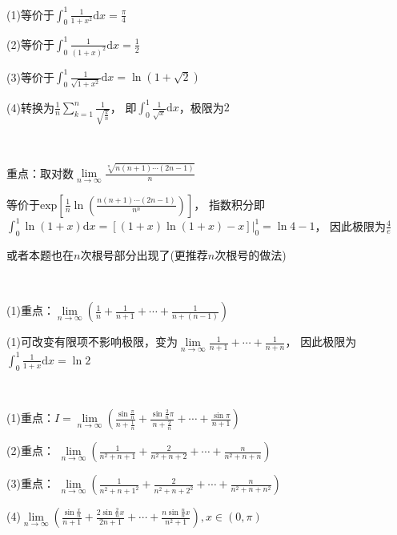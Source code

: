 \begin{solution}
  (1)等价于$\int_0^1 \frac{1}{1 + x^2}\mathrm{d} x = \frac{\pi}{4}$

  (2)等价于$\int_0^1 \frac{1}{(1 + x)^2}\mathrm{d} x = \frac{1}{2}$

  (3)等价于$\int_0^1 \frac{1}{\sqrt{1 + x^2}}\mathrm{d} x = \ln(1 + \sqrt{2})$
  
  (4)转换为$\frac{1}{n}\sum\limits_{k = 1}^n \frac{1}{\sqrt{\frac{k}{n}}}$，
  即$\int_0^1 \frac{1}{\sqrt{x}}\mathrm{d} x$，极限为$2$
\end{solution}

~

\begin{exercise}[对数+积分]
  重点：取对数$\lim \limits _{n \rightarrow \infty} \frac{\sqrt[n]{n(n+1)\cdots(2n-1)}}{n}$
\end{exercise}

\begin{solution}
  等价于$\text{exp} \left[ \frac{1}{n} \ln \left( \frac{n(n+1)\cdots(2n-1)}{n^n} \right) \right]$，
  指数积分即$\int_0^1 \ln(1+x)\mathrm{d} x = \left[ (1+x)\ln(1+x) - x \right] \bigg|_0^1 = \ln 4 - 1$，
  因此极限为$\frac{4}{e}$

  或者本题也在$n$次根号部分出现了(更推荐$n$次根号的做法)
\end{solution}

~

\begin{exercise}[改变有限项]
  (1)重点：$\lim \limits _{n \rightarrow \infty} \left( \frac{1}{n} + \frac{1}{n+1} + \cdots + \frac{1}{n+ (n-1)} \right)$
\end{exercise}

\begin{solution}
  (1)可改变有限项不影响极限，变为$\lim \limits _{n \rightarrow \infty} \frac{1}{n+1} + \cdots + \frac{1}{n+n}$，
  因此极限为$\int_0^1 \frac{1}{1+x}\mathrm{d} x = \ln 2$
\end{solution}


~

\begin{exercise}[经典夹逼+积分]
 (1)重点：$I = \lim \limits _{n \rightarrow \infty} \left( \frac{\sin \frac{\pi}{n}}{n + \frac{1}{n}} + \frac{\sin \frac{2}{n}\pi}{n + \frac{2}{n}} + \cdots + \frac{\sin \pi}{n + 1} \right)$

 (2)重点：
 $\lim \limits _{n \rightarrow \infty} \left( \frac{1}{n^2 + n + 1} + \frac{2}{n^2 + n + 2} + \cdots + \frac{n}{n^2 + n + n} \right)$

 (3)重点：
 $\lim \limits _{n \rightarrow \infty} \left( \frac{1}{n^2 + n + 1^2} + \frac{2}{n^2 + n + 2^2} + \cdots + \frac{n}{n^2 + n + n^2}\right)$

 (4)$\lim \limits _{n \rightarrow \infty} \left( \frac{\sin \frac{x}{n}}{n+1} + \frac{2 \sin \frac{2}{n}x}{2n + 1} + \cdots + \frac{n\sin \frac{n}{n}x}{n^2 + 1} \right), x \in (0,\pi)$
\end{exercise}

